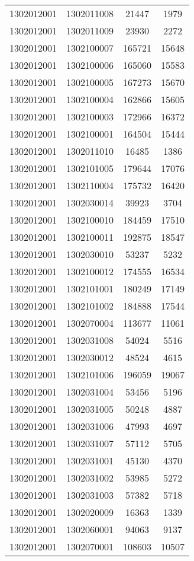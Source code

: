 \begin{longtable}{llcc}
1302012001 & 1302011008 & 21447 & 1979\\
1302012001 & 1302011009 & 23930 & 2272\\
1302012001 & 1302100007 & 165721 & 15648\\
1302012001 & 1302100006 & 165060 & 15583\\
1302012001 & 1302100005 & 167273 & 15670\\
1302012001 & 1302100004 & 162866 & 15605\\
1302012001 & 1302100003 & 172966 & 16372\\
1302012001 & 1302100001 & 164504 & 15444\\
1302012001 & 1302011010 & 16485 & 1386\\
1302012001 & 1302101005 & 179644 & 17076\\
1302012001 & 1302110004 & 175732 & 16420\\
1302012001 & 1302030014 & 39923 & 3704\\
1302012001 & 1302100010 & 184459 & 17510\\
1302012001 & 1302100011 & 192875 & 18547\\
1302012001 & 1302030010 & 53237 & 5232\\
1302012001 & 1302100012 & 174555 & 16534\\
1302012001 & 1302101001 & 180249 & 17149\\
1302012001 & 1302101002 & 184888 & 17544\\
1302012001 & 1302070004 & 113677 & 11061\\
1302012001 & 1302031008 & 54024 & 5516\\
1302012001 & 1302030012 & 48524 & 4615\\
1302012001 & 1302101006 & 196059 & 19067\\
1302012001 & 1302031004 & 53456 & 5196\\
1302012001 & 1302031005 & 50248 & 4887\\
1302012001 & 1302031006 & 47993 & 4697\\
1302012001 & 1302031007 & 57112 & 5705\\
1302012001 & 1302031001 & 45130 & 4370\\
1302012001 & 1302031002 & 53985 & 5272\\
1302012001 & 1302031003 & 57382 & 5718\\
1302012001 & 1302020009 & 16363 & 1339\\
1302012001 & 1302060001 & 94063 & 9137\\
1302012001 & 1302070001 & 108603 & 10507\\

\end{longtable}
